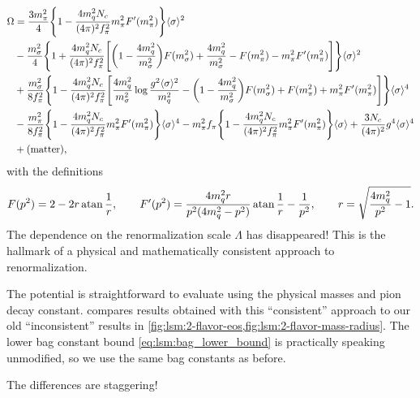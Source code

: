 \begin{equation}
\begin{split}
	\Omega &= \frac{3 m_\pi^2}{4} \Bigg\{ 1 - \frac{4 m_q^2 N_c}{(4\pi)^2 f_\pi^2} m_\pi^2 F'(m_\pi^2) \Bigg\} \langle \sigma \rangle^2 \\
	       &- \frac{m_\sigma^2}{4} \Bigg\{ 1 + \frac{4 m_q^2 N_c}{(4\pi)^2 f_\pi^2} \Bigg[ \bigg(1 - \frac{4 m_q^2}{m_\sigma^2}\bigg) F(m_\sigma^2) + \frac{4 m_q^2}{m_\sigma^2} - F(m_\pi^2) - m_\pi^2 F'(m_\pi^2) \Bigg] \Bigg\} \langle \sigma \rangle^2 \\
	       &+ \frac{m_\sigma^2}{8 f_\pi^2} \Bigg\{ 1 - \frac{4 m_q^2 N_c}{(4 \pi)^2 f_\pi^2} \Bigg[ \frac{4 m_q^2}{m_\sigma^2} \log \frac{g^2 \langle \sigma \rangle^2}{m_q^2} - \bigg(1 - \frac{4 m_q^2}{m_\sigma^2}\bigg) F(m_\sigma^2) + F(m_\pi^2) + m_\pi^2 F'(m_\pi^2) \Bigg] \Bigg\} \langle \sigma \rangle^4 \\
	       &- \frac{m_\pi^2}{8 f_\pi^2} \Bigg\{ 1 - \frac{4 m_q^2 N_c}{(4\pi)^2 f_\pi^2} m_\pi^2 F'(m_\pi^2) \Bigg\} \langle \sigma \rangle^4 - m_\pi^2 f_\pi \Bigg\{ 1 - \frac{4 m_q^2 N_c}{(4\pi)^2 f_\pi^2} m_\pi^2 F'(m_\pi^2) \Bigg\} \langle \sigma \rangle + \frac{3 N_c}{(4 \pi)^2} g^4 \langle \sigma \rangle^4 \\
	       &+ \text{(matter)} ,
\end{split}
\label{eq:lsm2f:grand_potential_consistent}
\end{equation}
with the definitions
\begin{equation}
	F(p^2) = 2 - 2 r \operatorname{atan} \frac1r, \qquad
	F'(p^2) = \frac{4 m_q^2 r}{p^2(4 m_q^2 - p^2)} \operatorname{atan} \frac1r - \frac{1}{p^2}, \qquad
	r = \sqrt{\frac{4 m_q^2}{p^2}-1} .
\end{equation}
The dependence on the renormalization scale $\Lambda$ has disappeared!
This is the hallmark of a physical and mathematically consistent approach to renormalization.

The potential is straightforward to evaluate using the physical masses and pion decay constant.
 compares results obtained with this ``consistent'' approach to our old ``inconsistent'' results in \cref{fig:lsm:2-flavor-eos,fig:lsm:2-flavor-mass-radius}.
The lower bag constant bound \eqref{eq:lsm:bag_lower_bound} is practically speaking unmodified, so we use the same bag constants as before.

The differences are staggering!

